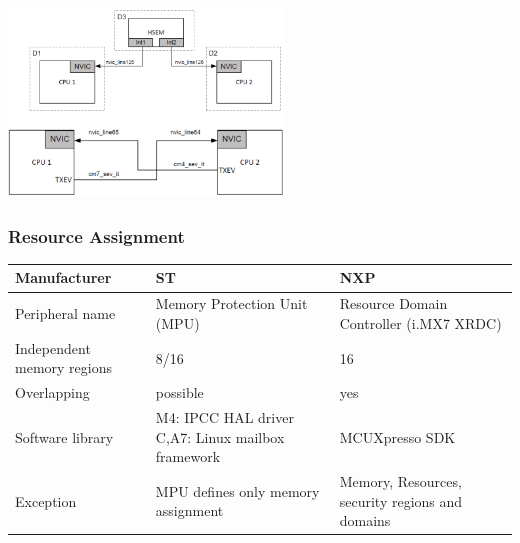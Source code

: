 \includegraphics[width=0.55\textwidth]{images/Multicore/hsem_nvic.png}

\subsubsection{Resource Assignment}
\begin{table}[h]
    \begin{tabularx}{\textwidth}{lXX}
        \hline
        Manufacturer               & ST                                                         & NXP                                             \\\hline
        Peripheral name            & Memory Protection Unit (MPU)                               & Resource Domain Controller (i.MX7 XRDC)         \\
        Independent memory regions & 8/16                                                       & 16                                              \\
        Overlapping                & possible                                                   & yes                                             \\
        Software library           & M4: IPCC HAL driver C,\newline A7: Linux mailbox framework & MCUXpresso SDK                                  \\
        Exception                  & MPU defines only memory assignment                         & Memory, Resources, security regions and domains \\\hline
    \end{tabularx}
\end{table}

